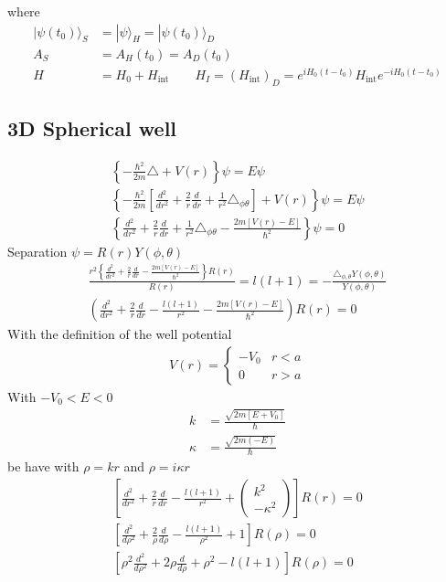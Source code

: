 \documentclass[../main.tex]{subfiles}
\begin{document}
where
\begin{align}
|\psi(t_0)\rangle_S&=|\psi\rangle_H=|\psi(t_0)\rangle_D\\
A_S&=A_H(t_0)=A_D(t_0)\\
H&=H_0+H_\text{int}\qquad H_I=(H_\text{int})_D=e^{iH_0(t-t_0)}H_\text{int}e^{-iH_0(t-t_0)}
\end{align}

\subsection{3D Spherical well}
\begin{align}
\left\{-\frac{\hbar^2}{2m}\triangle+V(r)\right\}\psi=E\psi\\
\left\{-\frac{\hbar^2}{2m}\left[\frac{d^2}{dr^2}+\frac{2}{r}\frac{d}{dr}+\frac{1}{r^2}\triangle_{\phi\theta}\right]+V(r)\right\}\psi=E\psi\\
\left\{\frac{d^2}{dr^2}+\frac{2}{r}\frac{d}{dr}+\frac{1}{r^2}\triangle_{\phi\theta}-\frac{2m[V(r)-E]}{\hbar^2}\right\}\psi=0
\end{align}
Separation $\psi=R(r)Y(\phi,\theta)$
\begin{align}
\frac{r^2\left\{\frac{d^2}{dr^2}+\frac{2}{r}\frac{d}{dr}-\frac{2m[V(r)-E]}{\hbar^2}\right\}R(r)}{R(r)}=l(l+1)=-\frac{\triangle_{\phi,\theta} Y(\phi,\theta)}{Y(\phi,\theta)}\\
\left(\frac{d^2}{dr^2}+\frac{2}{r}\frac{d}{dr}-\frac{l(l+1)}{r^2}-\frac{2m[V(r)-E]}{\hbar^2}\right)R(r)=0
\end{align}
With the definition of the well potential
\begin{align}
V(r)=\left\{\begin{matrix}
-V_0 & r<a\\
0 & r>a
\end{matrix}\right.
\end{align}
With $-V_0<E<0$
\begin{align}
k&=\frac{\sqrt{2m[E+V_0]}}{\hbar}\\
\kappa&=\frac{\sqrt{2m(-E)}}{\hbar}
\end{align}
be have with $\rho=kr$ and $\rho=i\kappa r$
\begin{align}
\left[\frac{d^2}{dr^2}+\frac{2}{r}\frac{d}{dr}-\frac{l(l+1)}{r^2}+
\left(\begin{matrix}
k^2\\
-\kappa^2
\end{matrix}\right)
\right]R(r)=0\\
\left[\frac{d^2}{d\rho^2}+\frac{2}{\rho}\frac{d}{d\rho}-\frac{l(l+1)}{\rho^2}+1\right]R(\rho)=0\\
\left[\rho^2\frac{d^2}{d\rho^2}+2\rho\frac{d}{d\rho}+\rho^2-l(l+1)\right]R(\rho)=0
\end{align}
\end{document}

